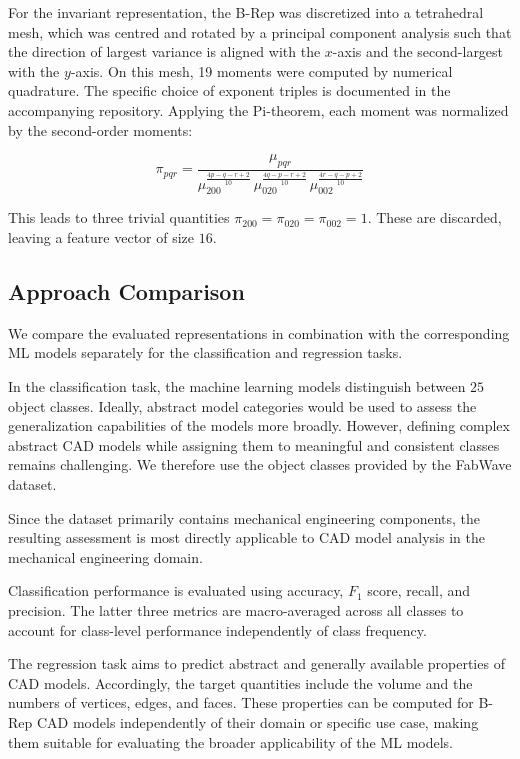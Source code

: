 \documentclass[5p,times,procedia]{elsarticle}
\begin{document}
For the invariant representation, the \mbox{B-Rep} was discretized into a tetrahedral mesh, which was centred and rotated by a principal component analysis such that the direction of largest variance is aligned with the $x$-axis and the second-largest with the $y$-axis.
On this mesh, 19 moments were computed by numerical quadrature. The specific choice of exponent triples is documented in the accompanying repository. Applying the Pi-theorem, each moment was normalized by the second-order moments:

\begin{equation}
\pi_{pqr} = \frac{\mu_{pqr}}{\mu_{200}^{\frac{4p-q-r+2}{10}}\,\mu_{020}^{\frac{4q-p-r+2}{10}}\,\mu_{002}^{\frac{4r-q-p+2}{10}}}
\end{equation}

This leads to three trivial quantities $\pi_{200}=\pi_{020}=\pi_{002}=1$. These are discarded, leaving a feature vector of size $16$.

\subsection{Approach Comparison}\label{sec:Methodology-Model-Comparison}
We compare the evaluated representations in combination with the corresponding ML models separately for the classification and regression tasks.

In the classification task, the machine learning models distinguish between $25$ object classes.
Ideally, abstract model categories would be used to assess the generalization capabilities of the models more broadly.
However, defining complex abstract CAD models while assigning them to meaningful and consistent classes remains challenging.
We therefore use the object classes provided by the FabWave dataset.

Since the dataset primarily contains mechanical engineering components, the resulting assessment is most directly applicable to CAD model analysis in the mechanical engineering domain.

Classification performance is evaluated using accuracy, $F_1$ score, recall, and precision.
The latter three metrics are \mbox{macro-averaged} across all classes to account for class-level performance independently of class frequency. 

The regression task aims to predict abstract and generally available properties of CAD models.
Accordingly, the target quantities include the volume and the numbers of vertices, edges, and faces.
These properties can be computed for \mbox{B-Rep} CAD models independently of their domain or specific use case, making them suitable for evaluating the broader applicability of the ML models.
\end{document}
